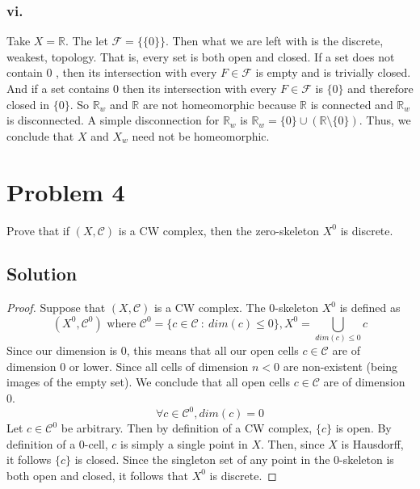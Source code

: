 \documentclass{article}
\theoremstyle{definition}
\begin{document}
    \subsubsection*{vi.}
    Take $X = \mathbb{R}$. The let $\mathcal{F} = \{\{0\}\}$.
    Then what we are left with is the discrete, weakest, topology.
    That is, every set is both open and closed. If a set does not contain 0
    , then its intersection with every $F \in \mathcal{F}$ is empty and 
    is trivially closed. And if a set contains 0 then its intersection with
    every $F \in \mathcal{F}$ is $\{0\}$ and therefore closed in $\{0\}$.
    So $\mathbb{R}_w$ and $\mathbb{R}$ are not homeomorphic because 
    $\mathbb{R}$ is connected and $\mathbb{R}_w$ is disconnected. A simple 
    disconnection for $\mathbb{R}_w$ is $\mathbb{R}_w = \{0\} \cup 
    (\mathbb{R} \setminus \{0\})$.
    Thus, we conclude that $X$ and $X_w$ need not be homeomorphic.
\pagebreak
\section*{Problem 4}
Prove that if $(X,\mathcal{C})$ is a CW complex, then the zero-skeleton $X^0$ is discrete.
\\ \hline
    \subsection*{Solution}

    \begin{proof}
    Suppose that $(X,\mathcal{C})$ is a CW complex.
    The 0-skeleton $X^0$ is defined as
    \[
    (X^0, \mathcal{C}^0) \text{ where } \mathcal{C}^0 = \{c \in \mathcal{C} \ : \ dim(c) \leq 0\}, X^0 = \bigcup_{dim(c) \leq 0}c
    \] 
    Since our dimension is 0, this means that all our open cells $c \in \mathcal{C}$
    are of dimension 0 or lower. Since all cells of dimension $n < 0$ 
    are non-existent (being images of the empty set). We conclude that
    all open cells $c \in \mathcal{C}$ are of dimension 0.
    \[
    \forall c \in \mathcal{C}^0, dim(c) = 0
    \] 
    Let $c \in \mathcal{C}^0$ be arbitrary.
    Then by definition of a CW complex, $\{c\}$ is open.
    By definition of a 0-cell, $c$ is simply a single point in $X$.
    Then, since $X$ is Hausdorff, it follows $\{c\}$ is closed.
    Since the singleton set of any point in the 0-skeleton is both open and closed,
    it follows that $X^0$ is discrete.
    \end{proof}
\pagebreak
\end{document}
